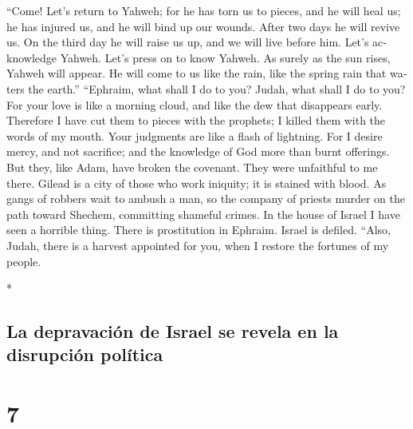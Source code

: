\begin{paracol}{2}
\begin{otherlanguage}{english}
 ``Come! Let's return to Yahweh; for he has torn us to
pieces, and he will heal us; he has injured us, and he will bind up our
wounds.  After two days he will revive us. On the third
day he will raise us up, and we will live before him. 
Let's acknowledge Yahweh. Let's press on to know Yahweh. As surely as
the sun rises, Yahweh will appear. He will come to us like the rain,
like the spring rain that waters the earth.''  ``Ephraim,
what shall I do to you? Judah, what shall I do to you? For your love is
like a morning cloud, and like the dew that disappears early.
 Therefore I have cut them to pieces with the prophets; I
killed them with the words of my mouth. Your judgments are like a flash
of lightning.  For I desire mercy, and not sacrifice; and
the knowledge of God more than burnt offerings.  But they,
like Adam, have broken the covenant. They were unfaithful to me there.
 Gilead is a city of those who work iniquity; it is
stained with blood.  As gangs of robbers wait to ambush a
man, so the company of priests murder on the path toward Shechem,
committing shameful crimes.  In the house of Israel I
have seen a horrible thing. There is prostitution in Ephraim. Israel is
defiled.  ``Also, Judah, there is a harvest appointed for
you, when I restore the fortunes of my people.

\end{otherlanguage}

\switchcolumn[0]*

\hypertarget{la-depravaciuxf3n-de-israel-se-revela-en-la-disrupciuxf3n-poluxedtica}{%
\subsection{La depravación de Israel se revela en la disrupción
política}\label{la-depravaciuxf3n-de-israel-se-revela-en-la-disrupciuxf3n-poluxedtica}}

\hypertarget{section-12}{%
\section{7}\label{section-12}}


\end{paracol}
